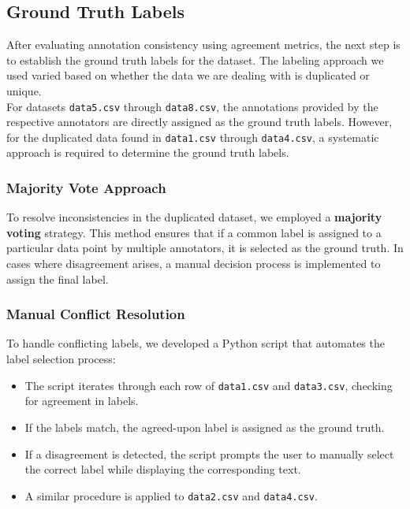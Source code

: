 \documentclass{article}
\begin{document}
\subsection*{Ground Truth Labels}
After evaluating annotation consistency using agreement metrics, the next step is to establish the ground truth labels for the dataset. The labeling approach we used varied based on whether the data we are dealing with is duplicated or unique.
\\

\noindent
For datasets \texttt{data5.csv} through \texttt{data8.csv}, the annotations provided by the respective annotators are directly assigned as the ground truth labels. However, for the duplicated data found in \texttt{data1.csv} through \texttt{data4.csv}, a systematic approach is required to determine the ground truth labels.

\subsubsection*{Majority Vote Approach}

To resolve inconsistencies in the duplicated dataset, we employed a \textbf{majority voting} strategy. This method ensures that if a common label is assigned to a particular data point by multiple annotators, it is selected as the ground truth. In cases where disagreement arises, a manual decision process is implemented to assign the final label.

\subsubsection*{Manual Conflict Resolution}

To handle conflicting labels, we developed a Python script that automates the label selection process:
\begin{itemize}
    \item The script iterates through each row of \texttt{data1.csv} and \texttt{data3.csv}, checking for agreement in labels.
    \item If the labels match, the agreed-upon label is assigned as the ground truth.
    \item If a disagreement is detected, the script prompts the user to manually select the correct label while displaying the corresponding text.
    \item A similar procedure is applied to \texttt{data2.csv} and \texttt{data4.csv}.
\end{itemize}
\end{document}
